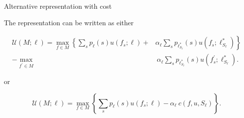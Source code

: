 \documentclass[usenames,dvipsnames,aspectratio=169,11pt]{beamer}
\begin{document}
\begin{frame}{Alternative representation with cost}\label{cost}

	The representation can be written as either

	\[
		\begin{aligned}
			\mathcal{U} \left(M ; \ell \right) = \max _{f \in M}\left\{\sum_{s} p_{\ell} \left( s \right) u \left( f_{s} ; \ell \right) + \right. & \left. \alpha_{\ell} \sum_{s} p_{\ell^{*}_{S_{\ell}}} \left( s \right) u \left( f_{s} ; \ell^{*}_{S_{\ell}} \right) \right\} \\
			-\max _{f^{\prime} \in M}                                                                                                             & \: \alpha _{\ell} \sum_{s} p_{\ell^{*}_{S_{\ell}}} \left( s \right) u\left(f^{\prime}_{s} ; \ell^{*}_{S_{\ell}} \right) .
		\end{aligned}
	\]

	or

	\[
		\mathcal{U} \left(M ; \ell \right) = \max _{f \in M}\left\{\sum_{s} p_{\ell} \left( s \right) u \left( f_{s} ; \ell \right) - \alpha_{\ell} \:  c \left( f, u, S_{\ell} \right) \right\} .
	\]

	\begin{flushright}
		\hyperlink{fullmodel}{}
	\end{flushright}

\end{frame}
\end{document}
